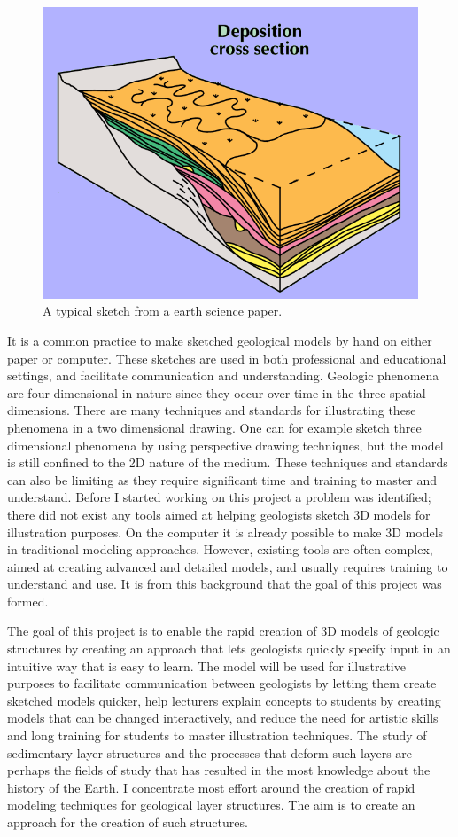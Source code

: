 \documentclass{cescg}[2005/11/12]
\begin{document}
\begin{figure}[b]
 \centering
 \includegraphics[width=0.7\linewidth]{strataSketch.png}
 \caption{A typical sketch from a earth science paper. }
 \label{fig:strataSketch}
\end{figure}
It is a common practice to make sketched geological models by hand on either paper or computer. These sketches are used in both professional and educational settings, and facilitate communication and understanding. Geologic phenomena are four dimensional in nature since they occur over time in the three spatial dimensions. There are many techniques and standards for illustrating these phenomena in a two dimensional drawing. One can for example sketch three dimensional phenomena by using perspective drawing techniques, but the model is still confined to the 2D nature of the medium. These techniques and standards can also be limiting  as they require significant time and training to master and understand. Before I started working on this project a problem was identified; there did not exist any tools aimed at helping geologists sketch 3D models for illustration purposes. On the computer it is already possible to make 3D models in traditional modeling approaches. However, existing tools are often complex, aimed 
at creating advanced and detailed models, and usually requires training to understand and use. It is from this background that the goal of this project was formed. 



The goal of this project is to enable the rapid creation of 3D models of geologic structures by creating an approach that lets geologists quickly specify input in an intuitive way that is easy to learn. The model will be used for illustrative purposes to facilitate communication between geologists by letting them create sketched models quicker, help lecturers explain concepts to students by creating models that can be changed interactively, and reduce the need for artistic skills and long training for students to master illustration techniques. The study of sedimentary layer structures and the processes that deform such layers are perhaps the fields of study that has resulted in the most knowledge about the history of the Earth. I concentrate most effort around the creation of rapid modeling techniques for geological layer structures. The aim is to create an approach for the creation of such structures.
\end{document}
